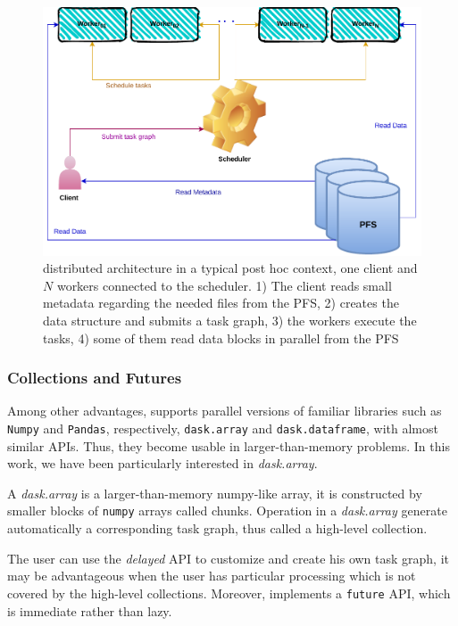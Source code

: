 \begin{figure}[tb]\centering
\includegraphics[scale=0.6]{figures/DaskArchiecture.pdf}
\caption{\dask distributed architecture in a typical post hoc context, one client and $N$ workers connected to the scheduler. 1) The client reads small metadata regarding the needed files from the PFS, 2) creates the \dask data structure and submits a task graph, 3) the workers execute the tasks, 4) some of them read data blocks in parallel from the PFS}
\label{figdaskarchi}
\end{figure}

\subsubsection{\dask Collections and Futures}

Among other advantages, \dask supports parallel versions of familiar libraries such as \texttt{Numpy} and \texttt{Pandas}, respectively, \texttt{dask.array} and \texttt{dask.dataframe}, with almost similar APIs. 
Thus, they become usable in larger-than-memory problems. In this work, we have been particularly interested in \textit{dask.array}. 

A \textit{dask.array}\cite{rocklin_dask_2015} is a larger-than-memory numpy-like array, it is constructed by smaller blocks of \texttt{numpy} arrays called chunks. Operation in a \textit{dask.array} generate automatically a corresponding task graph, thus called a high-level collection. 

The user can use the \textit{delayed} API to customize and create his own task graph, it may be advantageous when the user has particular processing which is not covered by the high-level collections. 
Moreover, \dask implements a \texttt{future} API, which is immediate rather than lazy.



